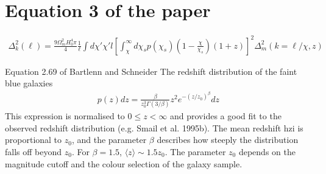 \documentclass[12pt,a4paper]{article}
\begin{document}
\section{Equation 3 of the paper}
\begin{eqnarray}
\Delta^2_k(\ell) = \frac{9 \Omega_m^2 H_0^4 \pi }{4} \frac{1}{\ell} \int d\chi' \chi' l\left[ \int_\chi^\infty d\chi_s p(\chi_s) (1 - \frac{\chi}{\chi_s})   (1 + z) \right]^2  \Delta_m^2(k = \ell/\chi, z)
\end{eqnarray}

Equation 2.69 of Bartlenn and Schneider
The redshift distribution of the faint blue galaxies 
\begin{eqnarray}
p(z) dz = \frac{\beta}{z_0^3 \Gamma(3/\beta)} z^2 e^{-(z/z_0)^\beta} dz
\end{eqnarray}
This expression is normalised to $ 0 \leq z <  \infty $ and provides a good fit to the observed redshift distribution (e.g. Smail et al.  1995b). The mean redshift hzi is proportional to $ z_0 $, and the parameter $\beta$ describes how steeply the distribution falls off beyond $ z_0 $. For $\beta = 1.5$, $\langle z\rangle \sim 1.5 z_0 $. The parameter $ z_0 $ depends on the magnitude cutoff and
the colour selection of the galaxy sample.
\end{document}
